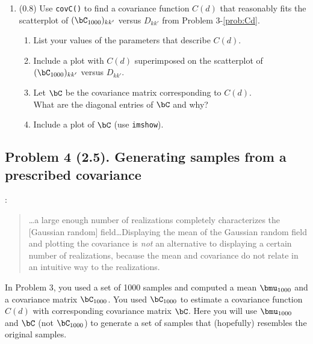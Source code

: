 \documentclass[11pt,titlepage,fleqn]{article}
\begin{document}
\begin{enumerate}

\item (0.8) Use \verb+covC()+ to find a covariance function $C(d)$ that reasonably fits the scatterplot of $(\bC_{1000})_{kk'}$ versus $D_{kk'}$ from Problem 3-\ref{prob:Cd}.
%
\begin{enumerate}
\item List your values of the parameters that describe $C(d)$.
\item Include a plot with $C(d)$ superimposed on the scatterplot of $(\bC_{1000})_{kk'}$ versus $D_{kk'}$.
\item Let $\bC$ be the covariance matrix corresponding to $C(d)$. \\
What are the diagonal entries of $\bC$ and why?
\item Include a plot of $\bC$ (use \verb+imshow+).
\end{enumerate}

\label{prob:covC}

\end{enumerate}


\subsection*{Problem 4 (2.5). Generating samples from a prescribed covariance}

\citet[][p.~45]{Tarantola2005}:
%
\begin{quote}
\ldots a large enough number of realizations completely characterizes the [Gaussian random] field\ldots Displaying the mean of the Gaussian random field and plotting the covariance is {\em not} an alternative to displaying a certain number of realizations, because the mean and covariance do not relate in an intuitive way to the realizations.
\end{quote}

\noindent
In Problem 3, you used a set of 1000 samples and computed a mean $\bmu_{1000}$ and a covariance matrix $\bC_{1000}$. You used $\bC_{1000}$ to estimate a covariance function $C(d)$ with corresponding covariance matrix $\bC$. Here you will use $\bmu_{1000}$ and $\bC$ (not $\bC_{1000}$) to generate a set of samples that (hopefully) resembles the original samples.
\end{document}
